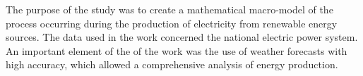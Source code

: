 The purpose of the study was to create a mathematical macro-model of the process occurring during the production of electricity
from renewable energy sources. The data used in the work concerned the national electric power system. An important element of the 
of the work was the use of weather forecasts with high accuracy, which allowed a comprehensive analysis of energy production.